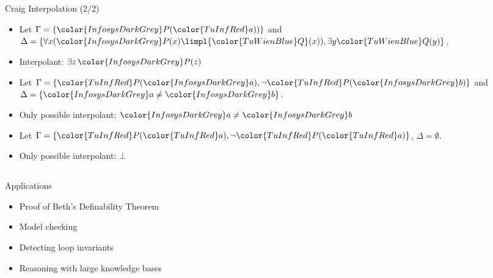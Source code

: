 \documentclass[final,compress]{beamer}
\newcommand{\colOne}[1]{{\color{TuInfRed}#1}}
\newcommand{\colTwo}[1]{{\color{TuWienBlue}#1}}
\newcommand{\colA}[1]{\colOne{#1}}
\newcommand{\colB}[1]{\colTwo{#1}}
\newcommand{\gray}[1]{{\color{InfosysDarkGrey}#1}}
\begin{document}
\subsection{}
\begin{frame}{Craig Interpolation (2/2)}
	\begin{example}
		\begin{itemize}
			\item Let $\Gamma = \{\gray P(\colA a)) \}$ and $\Delta = \{ \forall x (\gray P(x) \limpl \colB Q(x)), \exists y \colB Q(y) \}$.
				\pause
			\item Interpolant: $\exists z \,\gray P(z)$
		\end{itemize}
	\end{example}

	\pause

	\begin{example}
		\begin{itemize}
			\item Let $\Gamma = \{\colA P(\gray a), \lnot \colA P(\gray b)\}$ and $\Delta = \{ \gray a \neq \gray b \}$.
				\pause 
			\item Only possible interpolant: $\gray a \neq \gray b$
		\end{itemize}
	\end{example}

	\pause

	\begin{example}
		\begin{itemize}
			\item Let $\Gamma = \{\colA P(\colA a), \lnot \colA P(\colA a) \}$, $\Delta = \emptyset$.
				\pause 
			\item Only possible interpolant: $\bot$
		\end{itemize}
	\end{example}

\end{frame}

\subsection{}
\begin{frame}{Applications}
	\begin{itemize}
		\item Proof of Beth's Definability Theorem
		\item Model checking
		\item Detecting loop invariants
		\item Reasoning with large knowledge bases
	\end{itemize}
\end{frame}
\end{document}

